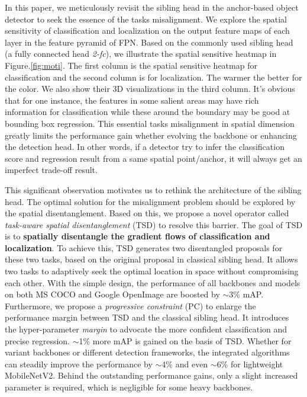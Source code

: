 \documentclass[10pt,twocolumn,letterpaper]{article}
\def \algfullname{\emph{task-aware spatial disentanglement}}
\def \algname{TSD}
\def \loss{PC}
\begin{document}
In this paper, we meticulously revisit the sibling head in the anchor-based object detector to seek the essence of the tasks misalignment.
We explore the spatial sensitivity of classification and localization on the output feature maps of each layer in the feature pyramid of FPN. Based on the commonly used sibling head (a fully connected head \emph{2-fc}), we illustrate the spatial sensitive heatmap in Figure.\ref{fig:moti}.
The first column is the spatial sensitive heatmap for classification and the second column is for localization. The warmer the better for the color. We also show their 3D visualizations in the third column.
It's obvious that for one instance, the features in some salient areas may have rich information for classification while these around the boundary may be good at bounding box regression.
This essential tasks misalignment in spatial dimension greatly limits the performance gain whether evolving the backbone or enhancing the detection head. In other words, if a detector try to infer the classification score and regression result from a same spatial point/anchor, it will always get an imperfect trade-off result.

This significant observation motivates us to rethink the architecture of the sibling head. The optimal solution for the misalignment problem should be explored by the spatial disentanglement. Based on this, we propose a novel operator called \algfullname{} (\algname{}) to resolve this barrier.
The goal of \algname{} is to \textbf{spatially disentangle the gradient flows of classification and localization}. To achieve this, \algname{} generates two disentangled proposals for these two tasks, based on the original proposal in classical sibling head.
It allows two tasks to adaptively seek the optimal location in space without compromising each other.
With the simple design, the performance of all backbones and models on both MS COCO and Google OpenImage are boosted by $\sim$3\% mAP. 
Furthermore, we propose a \emph{progressive constraint} (\loss{}) to enlarge the performance margin between \algname{} and the classical sibling head.
It introduces the hyper-parameter \emph{margin} to advocate the more confident classification and precise regression. $\sim$1\% more mAP is gained on the basis of \algname{}.
Whether for variant backbones or different detection frameworks, 
the integrated algorithms can steadily improve the performance by $\sim$4\% and even $\sim$6\% for lightweight MobileNetV2.
Behind the outstanding performance gains, only a slight increased parameter is required, which is negligible for some heavy backbones.
\end{document}
